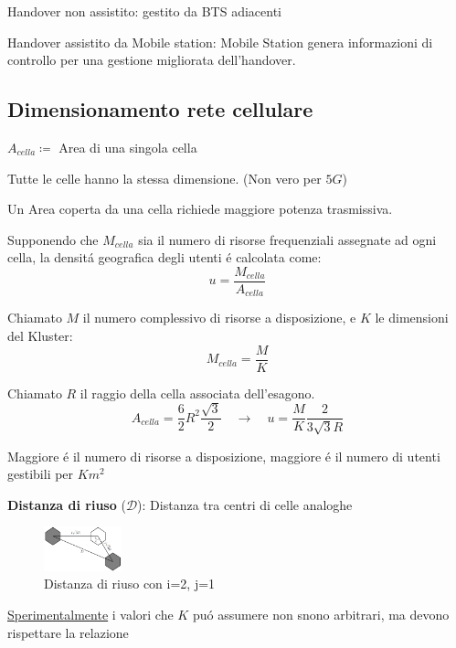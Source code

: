 \documentclass{article}
\begin{document}
Handover non assistito: gestito da BTS adiacenti

Handover assistito da Mobile station: Mobile Station genera informazioni di controllo per una gestione migliorata dell'handover.

\subsection{Dimensionamento rete cellulare}

$A_{cella} \coloneqq$ Area di una singola cella

Tutte le celle hanno la stessa dimensione. (Non vero per $5G$)

Un Area coperta da una cella richiede maggiore potenza trasmissiva.

Supponendo che $M_{cella}$ sia il numero di risorse frequenziali assegnate ad ogni cella, la densit\'a geografica degli utenti \'e calcolata come:
\[ u = \frac{M_{cella}}{A_{cella}} \]


Chiamato $M$ il numero complessivo di risorse a disposizione, e $K$ le dimensioni del Kluster:
\[ M_{cella} = \frac{M}{K} \]

Chiamato $R$ il raggio della cella associata dell'esagono.
\[ A_{cella} = \frac{6}{2}R^2\frac{\sqrt{3}}{2} \quad \rightarrow \quad
    u=\frac{M}{K}\frac{2}{3\sqrt{3}R}
\]

Maggiore \'e il numero di risorse a disposizione, maggiore \'e il numero di utenti gestibili per $Km^2$


\textbf{Distanza di riuso} ($\mathcal{D}$): Distanza tra centri di celle analoghe

\begin{figure}[h]
    \includegraphics[width=0.2\textwidth]{img/sdt/distanza_riuso}
    \centering
    \caption{Distanza di riuso con i=2, j=1}
\end{figure}
\underline{Sperimentalmente} i valori che $K$ pu\'o assumere non snono arbitrari, ma devono rispettare la relazione
\end{document}
